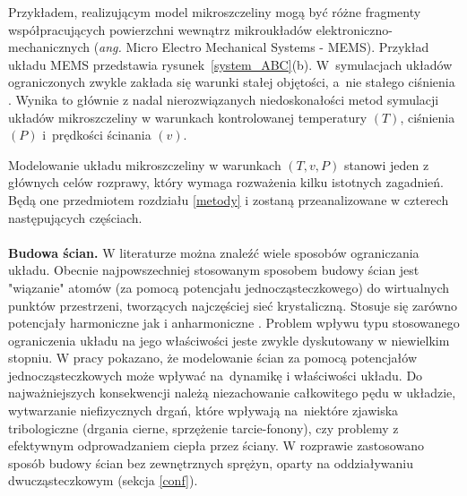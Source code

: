 \documentclass[12pt,a4paper,openright]{report} %
\begin{document}
Przykładem, realizującym model mikroszczeliny mogą być różne fragmenty współpracujących powierzchni wewnątrz mikroukładów elektroniczno-mechanicznych  (\textit{ang.} Micro Electro Mechanical Systems - MEMS). Przykład układu MEMS przedstawia rysunek~\ref{system_ABC}(b).
W~symulacjach układów ograniczonych zwykle zakłada się warunki stałej objętości, a~nie stałego ciśnienia \cite{hartkamp,LiemBrownClarke}. Wynika to głównie z nadal nierozwiązanych niedoskonałości metod symulacji układów mikroszczeliny w warunkach kontrolowanej temperatury $(T)$, ciśnienia $(P)$ i~prędkości ścinania $(v)$.

Modelowanie układu mikroszczeliny w warunkach $(T, v, P)$ stanowi jeden z głównych celów rozprawy, który wymaga rozważenia kilku istotnych zagadnień. 
Będą one przedmiotem rozdziału \ref{metody} i zostaną przeanalizowane w czterech następujących częściach.
\\
\\
\textbf{Budowa ścian.} W literaturze można znaleźć wiele sposobów ograniczania układu. Obecnie najpowszechniej stosowanym sposobem budowy ścian jest "wiązanie" atomów (za pomocą potencjału jednocząsteczkowego) do wirtualnych punktów przestrzeni, tworzących najczęściej sieć krystaliczną. Stosuje się zarówno potencjały harmoniczne \cite{Todd} jak i anharmoniczne \cite{ButlerHarrowell2003, PetravicHarrowell2006}. Problem wpływu typu stosowanego ograniczenia układu na jego właściwości jeste zwykle dyskutowany w niewielkim stopniu. W pracy pokazano, że modelowanie ścian za pomocą potencjałów jednocząsteczkowych może wpływać na~dynamikę i właściwości układu. Do najważniejszych konsekwencji należą niezachowanie całkowitego pędu w układzie, wytwarzanie niefizycznych drgań, które wpływają na~niektóre zjawiska tribologiczne (drgania cierne, sprzężenie tarcie-fonony), czy problemy z efektywnym odprowadzaniem ciepła przez ściany. W rozprawie zastosowano sposób budowy ścian bez zewnętrznych sprężyn, oparty na oddziaływaniu dwucząsteczkowym (sekcja \ref{conf}). 
\\
\\
\end{document}

